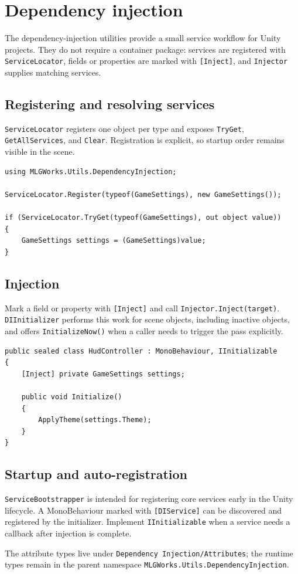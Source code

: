 \section{Dependency injection}
\label{sec:dependency-injection}

The dependency-injection utilities provide a small service workflow for Unity projects. They do not require a container package: services are registered with \texttt{ServiceLocator}, fields or properties are marked with \texttt{[Inject]}, and \texttt{Injector} supplies matching services.

\subsection{Registering and resolving services}
\texttt{ServiceLocator} registers one object per type and exposes \texttt{TryGet}, \texttt{GetAllServices}, and \texttt{Clear}. Registration is explicit, so startup order remains visible in the scene.

\begin{lstlisting}
using MLGWorks.Utils.DependencyInjection;

ServiceLocator.Register(typeof(GameSettings), new GameSettings());

if (ServiceLocator.TryGet(typeof(GameSettings), out object value))
{
    GameSettings settings = (GameSettings)value;
}
\end{lstlisting}

\subsection{Injection}
Mark a field or property with \texttt{[Inject]} and call \texttt{Injector.Inject(target)}. \texttt{DIInitializer} performs this work for scene objects, including inactive objects, and offers \texttt{InitializeNow()} when a caller needs to trigger the pass explicitly.

\begin{lstlisting}
public sealed class HudController : MonoBehaviour, IInitializable
{
    [Inject] private GameSettings settings;

    public void Initialize()
    {
        ApplyTheme(settings.Theme);
    }
}
\end{lstlisting}

\subsection{Startup and auto-registration}
\texttt{ServiceBootstrapper} is intended for registering core services early in the Unity lifecycle. A MonoBehaviour marked with \texttt{[DIService]} can be discovered and registered by the initializer. Implement \texttt{IInitializable} when a service needs a callback after injection is complete.

The attribute types live under \texttt{Dependency Injection/Attributes}; the runtime types remain in the parent namespace \texttt{MLGWorks.Utils.DependencyInjection}.
